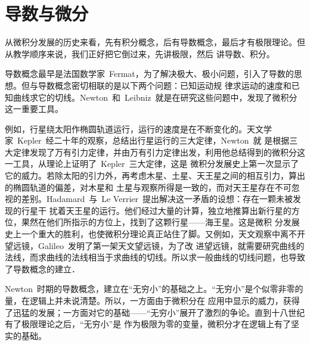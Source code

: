 

\chapter{导数与微分}\label{ch:4}

从微积分发展的历史来看，先有积分概念，后有导数概念，最后才有极限理论。但从教学顺序来说，我们正好把它倒过来，先讲极限，然后
讲导数、积分。

导数概念最早是法国数学家~Fermat，为了解决极大、极小问题，引入了导数的思想。但与导数概念密切相联的是以下两个问题：已知运动规
律求运动的速度和已知曲线求它的切线。Newton~和~Leibniz~就是在研究这些问题中，发现了微积分这一重要工具。

例如，行星绕太阳作椭圆轨道运行，运行的速度是在不断变化的。天文学家~Kepler~经二十年的观察，总结出行星运行的三大定律，Newton~就
是根据三大定律发现了万有引力定律，并由万有引力定律出发，利用他总结得到的微积分这一工具，从理论上证明了~Kepler~三大定律，这是
微积分发展史上第一次显示了它的威力。若除太阳的引力外，再考虑木星、土星、天王星之间的相互引力，算出的椭圆轨道的偏差，对木星和
土星与观察所得是一致的，而对天王星存在不可忽视的差别。Hadamard~与~Le Verrier~提出解决这一矛盾的设想：存在一颗未被发现的行星干
扰着天王星的运行。他们经过大量的计算，独立地推算出新行星的方位，果然在他们所指示的方位上，找到了这颗行星——海王星。这是微积
分发展史上一个重大的胜利，也使微积分理论真正站住了脚。又例如，天文观察中离不开望远镜，Galileo~发明了第一架天文望远镜，为了改
进望远镜，就需要研究曲线的法线，而求曲线的法线相当于求曲线的切线。所以求一般曲线的切线问题，也导致了导数概念的建立．

Newton~时期的导数概念，建立在“无穷小”的基础之上。“无穷小”是个似零非零的量，在逻辑上并未说清楚。所以，一方面由于微积分在
应用中显示的威力，获得了迅猛的发展；一方面对它的基础——“无穷小”展开了激烈的争论。直到十八世纪有了极限理论之后，“无穷小”是
作为极限为零的变量，微积分才在逻辑上有了坚实的基础。



